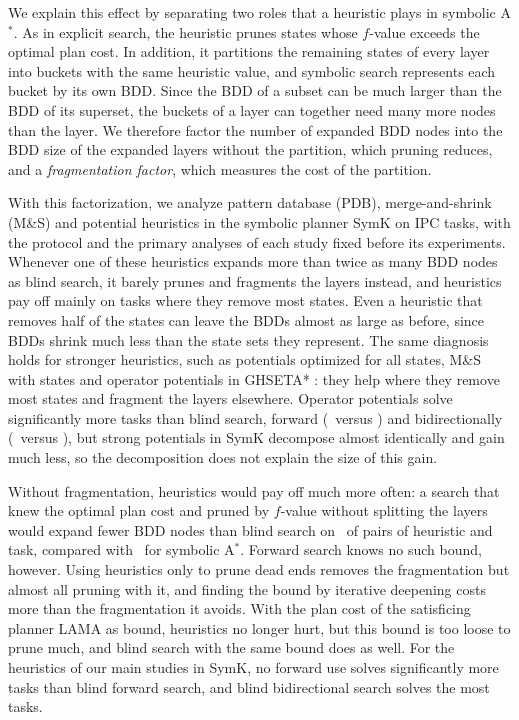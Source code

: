 \documentclass[letterpaper]{article}
\newcommand{\astar}{A\ensuremath{^{*}}}
\newcommand{\num}[1]{\numprint{#1}}
\theoremstyle{plain}
\theoremstyle{definition}
\theoremstyle{remark}
\begin{document}
We explain this effect by separating two roles that a heuristic plays in symbolic \astar.
As in explicit search, the heuristic prunes states whose $f$-value exceeds the optimal plan cost.
In addition, it partitions the remaining states of every layer into buckets with the same heuristic value, and symbolic search represents each bucket by its own BDD.
Since the BDD of a subset can be much larger than the BDD of its superset, the buckets of a layer can together need many more nodes than the layer.
We therefore factor the number of expanded BDD nodes into the BDD size of the expanded layers without the partition, which pruning reduces, and a \emph{fragmentation factor}, which measures the cost of the partition.

With this factorization, we analyze pattern database (PDB), merge-and-shrink (M\&S) and potential heuristics in the symbolic planner SymK \citep{speck-et-al-jair2025} on \num{\HoldoutTasks} IPC tasks, with the protocol and the primary analyses of each study fixed before its experiments.
Whenever one of these heuristics expands more than twice as many BDD nodes as blind search, it barely prunes and fragments the layers instead, and heuristics pay off mainly on tasks where they remove most states.
Even a heuristic that removes half of the states can leave the BDDs almost as large as before, since BDDs shrink much less than the state sets they represent.
The same diagnosis holds for stronger heuristics, such as potentials optimized for all states, M\&S with \num{200000} states and operator potentials in GHSETA* \citep{fiser-et-al-aij2024}: they help where they remove most states and fragment the layers elsewhere.
Operator potentials solve significantly more tasks than blind search, forward (\CpSolvedPotFw\ versus \CpSolvedBlindFw) and bidirectionally (\CpSolvedPotBi\ versus \CpSolvedBlindBi), but strong potentials in SymK decompose almost identically and gain much less, so the decomposition does not explain the size of this gain.

Without fragmentation, heuristics would pay off much more often: a search that knew the optimal plan cost and pruned by $f$-value without splitting the layers would expand fewer BDD nodes than blind search on \OracleAllUnsplitBelow\ of \num{\GenAllPairs} pairs of heuristic and task, compared with \OracleAllEffortBelow\ for symbolic \astar.
Forward search knows no such bound, however.
Using heuristics only to prune dead ends removes the fragmentation but almost all pruning with it, and finding the bound by iterative deepening costs more than the fragmentation it avoids.
With the plan cost of the satisficing planner LAMA as bound, heuristics no longer hurt, but this bound is too loose to prune much, and blind search with the same bound does as well.
For the heuristics of our main studies in SymK, no forward use solves significantly more tasks than blind forward search, and blind bidirectional search solves the most tasks.
\end{document}
